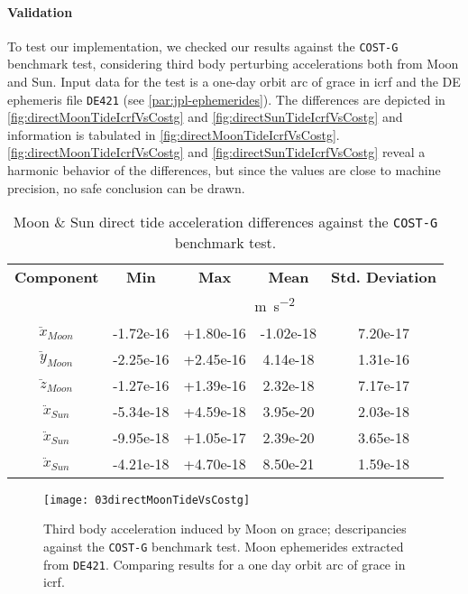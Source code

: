 \paragraph{Validation}\label{sssec:third-body-perurbation-validation}

To test our implementation, we checked our results against the \texttt{COST-G} 
benchmark test, considering third body perturbing accelerations both from Moon and Sun. 
Input data for the test is a one-day orbit arc of \gls{grace} in \gls{icrf} and 
the DE ephemeris file \texttt{DE421} (see \autoref{par:jpl-ephemerides}). 
The differences are depicted in \autoref{fig:directMoonTideIcrfVsCostg} and \autoref{fig:directSunTideIcrfVsCostg} 
and information is tabulated in \autoref{fig:directMoonTideIcrfVsCostg}.
\autoref{fig:directMoonTideIcrfVsCostg} and \autoref{fig:directSunTideIcrfVsCostg} reveal a 
harmonic behavior of the differences, but since the values are close to machine precision, 
no safe conclusion can be drawn.

\begin{table}[]
  \centering
  \begin{tabular}{ccccc}
      \textbf{Component} & \textbf{Min} & \textbf{Max} & \textbf{Mean} & \textbf{Std. Deviation}\\
      & \multicolumn{4}{c}{\si{\metre\per\square\second}} \\
      \hline
      $\ddot{x}_{Moon}$ & -1.72e-16 & +1.80e-16 & -1.02e-18 & 7.20e-17 \\ 
      $\ddot{y}_{Moon}$ & -2.25e-16 & +2.45e-16 & 4.14e-18  & 1.31e-16 \\
      $\ddot{z}_{Moon}$ & -1.27e-16 & +1.39e-16 & 2.32e-18  & 7.17e-17 \\
      $\ddot{x}_{Sun}$  & -5.34e-18 & +4.59e-18 & 3.95e-20  & 2.03e-18 \\
      $\ddot{x}_{Sun}$  & -9.95e-18 & +1.05e-17 & 2.39e-20  & 3.65e-18 \\
      $\ddot{x}_{Sun}$  & -4.21e-18 & +4.70e-18 & 8.50e-21  & 1.59e-18 \\
      \hline
  \end{tabular}
  \caption{Moon \& Sun direct tide acceleration differences against the \texttt{COST-G} benchmark test.}
  \label{table:directMoonTideIcrfVsCostg}
\end{table}

\begin{figure}
  \centering
  \texttt{[image: 03directMoonTideVsCostg]}
  \caption{Third body acceleration induced by Moon on \gls{grace}; descripancies 
   against the \texttt{COST-G} benchmark test. Moon ephemerides extracted from \texttt{DE421}.
   Comparing results for a one day orbit arc of \gls{grace} in \gls{icrf}.}
  \label{fig:directMoonTideIcrfVsCostg}
\end{figure}

